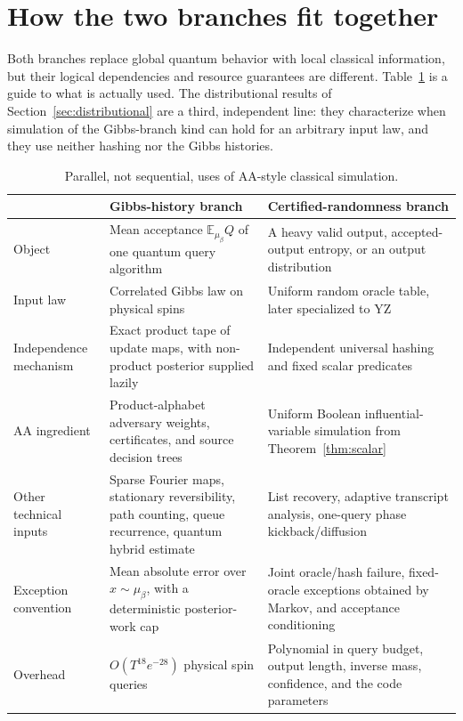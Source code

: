\documentclass[11pt]{article}
\theoremstyle{definition}\newtheorem{definition}[theorem]{Definition}
\theoremstyle{remark}\newtheorem{remark}[theorem]{Remark}
\newcommand{\E}{\mathbb E}\newcommand{\Prb}{\mathbb P}
\begin{document}
\section{How the two branches fit together}\label{sec:connections}
Both branches replace global quantum behavior with local classical information, but their logical dependencies and resource guarantees are different. Table~\ref{tab:branches} is a guide to what is actually used. The distributional results of Section~\ref{sec:distributional} are a third, independent line: they characterize when simulation of the Gibbs-branch kind can hold for an arbitrary input law, and they use neither hashing nor the Gibbs histories.

\begin{table}[h]
\centering\small
\begin{tabularx}{\textwidth}{@{}>{\raggedright\arraybackslash}p{}>{\raggedright\arraybackslash}X>{\raggedright\arraybackslash}X@{}}
\toprule
& \textbf{Gibbs-history branch} & \textbf{Certified-randomness branch}\\
\midrule
Object & Mean acceptance \(\E_{\mu_\beta}Q\) of one quantum query algorithm & A heavy valid output, accepted-output entropy, or an output distribution\\
Input law & Correlated Gibbs law on physical spins & Uniform random oracle table, later specialized to YZ\\
Independence mechanism & Exact product tape of update maps, with non-product posterior supplied lazily & Independent universal hashing and fixed scalar predicates\\
AA ingredient & Product-alphabet adversary weights, certificates, and source decision trees & Uniform Boolean influential-variable simulation from Theorem~\ref{thm:scalar}\\
Other technical inputs & Sparse Fourier maps, stationary reversibility, path counting, queue recurrence, quantum hybrid estimate & List recovery, adaptive transcript analysis, one-query phase kickback/diffusion\\
Exception convention & Mean absolute error over \(x\sim\mu_\beta\), with a deterministic posterior-work cap & Joint oracle/hash failure, fixed-oracle exceptions obtained by Markov, and acceptance conditioning\\
Overhead & \(O(T^{18}e^{-28})\) physical spin queries & Polynomial in query budget, output length, inverse mass, confidence, and the code parameters\\
\bottomrule
\end{tabularx}
\caption{Parallel, not sequential, uses of AA-style classical simulation.}\label{tab:branches}
\end{table}
\end{document}
